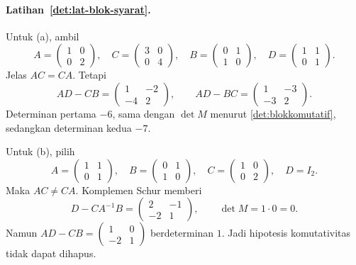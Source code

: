       \paragraph{Latihan~\ref{det:lat-blok-syarat}.}
      Untuk (a), ambil
      \[
            A=\begin{pmatrix}1&0\\0&2\end{pmatrix},\quad
            C=\begin{pmatrix}3&0\\0&4\end{pmatrix},\quad
            B=\begin{pmatrix}0&1\\1&0\end{pmatrix},\quad
            D=\begin{pmatrix}1&1\\0&1\end{pmatrix}.
      \]
      Jelas $AC=CA$. Tetapi
      \[
            AD-CB=\begin{pmatrix}1&-2\\-4&2\end{pmatrix},\qquad
            AD-BC=\begin{pmatrix}1&-3\\-3&2\end{pmatrix}.
      \]
      Determinan pertama $-6$, sama dengan $\det M$ menurut
      \autoref{det:blokkomutatif}, sedangkan determinan kedua $-7$.

      Untuk (b), pilih
      \[
            A=\begin{pmatrix}1&1\\0&1\end{pmatrix},\quad
            B=\begin{pmatrix}0&1\\1&0\end{pmatrix},\quad
            C=\begin{pmatrix}1&0\\0&2\end{pmatrix},\quad D=I_2.
      \]
      Maka $AC\ne CA$. Komplemen Schur memberi
      \[
            D-CA^{-1}B=\begin{pmatrix}2&-1\\-2&1\end{pmatrix},
            \qquad \det M=1\cdot0=0.
      \]
      Namun $AD-CB=\left(\begin{smallmatrix}1&0\\-2&1\end{smallmatrix}\right)$
      berdeterminan $1$. Jadi hipotesis komutativitas tidak dapat dihapus.

